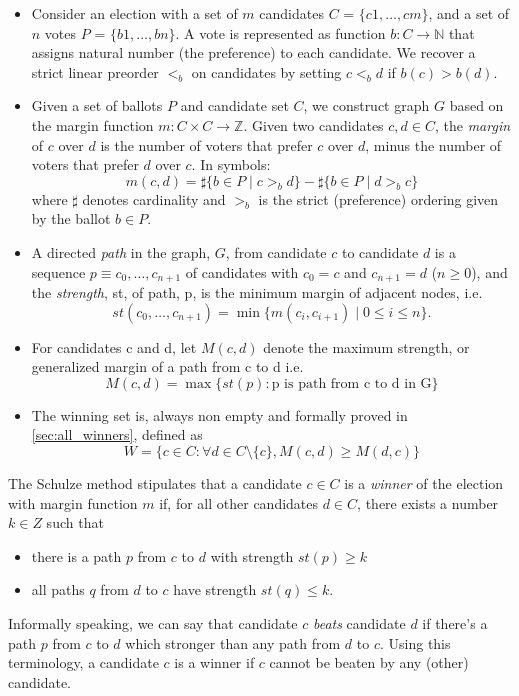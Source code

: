 \begin{itemize}

\item Consider an election with a set of $m$ candidates
 $C$ = $\{c1,\dots,cm\}$, and 
	a set of $n$ votes $P$ = $\{b1,\dots,bn\}$. A vote
	is represented as function $b: C \rightarrow \mathbb{N}$ that 
	assigns natural 
	number (the preference) to each candidate. We recover a strict linear  
	preorder $<_b$ on candidates by setting $c <_b d$ if $b(c) > b(d)$. 
	
\item Given a set of ballots $P$ and candidate set $C$, we construct graph $G$ based on the margin function $m: C \times C \to \mathbb{Z}$. Given two candidates $c, d \in C$,
the \emph{margin} of $c$ over $d$ is
the number of voters that prefer $c$ over $d$, minus the number of voters that prefer $d$ over $c$. 
In symbols:
\[
  m(c, d) = \sharp \lbrace b \in P \mid c >_b d \rbrace -
            \sharp \lbrace b \in P \mid d >_b c \rbrace
\] where $\sharp$ denotes cardinality and $>_b$ is the strict
(preference) ordering given by the ballot $b \in P$.





\item A directed \emph{path} in the graph, $G$, from
candidate $c$ to candidate $d$ is a sequence $p \equiv c_0, \dots, c_{n+1}$
of candidates with $c_0 = c$ and $c_{n+1} = d$ ($n \geq 0$), and the
\emph{strength}, st, of path, p, is the minimum margin of adjacent
nodes, i.e.
\[ st(c_0, \dots, c_{n+1}) = \min \lbrace m (c_i, c_{i+1}) \mid 0
\leq i \leq n \rbrace. \]
\item For candidates c and d, let $M(c, d)$ denote the maximum strength, or generalized margin of a path
	from c to d i.e. 
	\[ M(c, d) = \max \lbrace st (p) : \text{p is path from c to d in G} \rbrace\]
	
\item The winning set is, always non empty and  formally proved in \ref{sec:all_winners}, defined as 
 \[ W =  \lbrace c \in C : \forall d \in C \setminus \{c\}, M (c, d) \geq M (d, c) \rbrace\]

\end{itemize}

The Schulze method
stipulates that a candidate $c \in C$ is a \emph{winner} of the
election with margin function $m$ if, for all other candidates $d \in
C$, there exists a number $k \in Z$ such that
\begin{itemize}
\item there is a path $p$ from $c$ to $d$ with strength $st(p) \geq k$
\item all paths $q$ from $d$ to $c$ have strength $st(q) \leq k$.
\end{itemize}
Informally speaking, we can say that  candidate $c$
\emph{beats} candidate $d$ if there's a path $p$ from
$c$ to $d$ which stronger than any path from $d$ to $c$. Using
this terminology, a candidate $c$ is a winner if $c$ cannot be
beaten by any (other) candidate.


